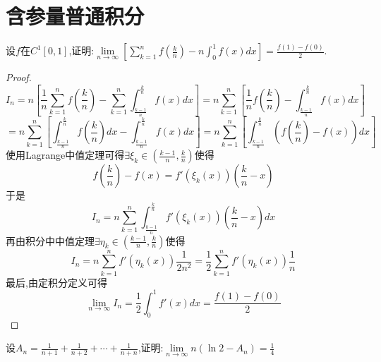 \chapter{含参量普通积分}

\begin{example}
	设$f$在$
		C^1\left[ 0,1 \right]
	$,证明:$
		\lim\limits_{n\rightarrow \infty}\left[ \sum_{k=1}^n{f\left( \frac{k}{n} \right) -n\int_0^1{f\left( x \right)}dx} \right] =\frac{f\left( 1 \right) -f\left( 0 \right)}{2}
	$.
\end{example}

\begin{proof}
	$$
		I_n=n\left[ \frac{1}{n}\sum_{k=1}^n{f\left( \frac{k}{n} \right) -\sum_{k=1}^n{\int_{\frac{k-1}{n}}^{\frac{k}{n}}{f\left( x \right)}dx}} \right] =n\sum_{k=1}^n{\left[ \frac{1}{n}f\left( \frac{k}{n} \right) -\int_{\frac{k-1}{n}}^{\frac{k}{n}}{f\left( x \right)}dx \right]}
	$$
	$$
		=n\sum_{k=1}^n{\left[ \int_{\frac{k-1}{n}}^{\frac{k}{n}}{f\left( \frac{k}{n} \right) dx}-\int_{\frac{k-1}{n}}^{\frac{k}{n}}{f\left( x \right)}dx \right]}=n\sum_{k=1}^n{\left[ \int_{\frac{k-1}{n}}^{\frac{k}{n}}{\left( f\left( \frac{k}{n} \right) -f\left( x \right) \right) dx} \right]}
	$$
	使用Lagrange中值定理可得$
		\exists \xi _k\in \left( \frac{k-1}{n},\frac{k}{n} \right)
	$使得
	$$
		f\left( \frac{k}{n} \right) -f\left( x \right) =f'\left( \xi _k\left( x \right) \right) \left( \frac{k}{n}-x \right)
	$$
	于是$$
		I_n=n\sum_{k=1}^n{\int_{\frac{k-1}{n}}^{\frac{k}{n}}{f'\left( \xi _k\left( x \right) \right) \left( \frac{k}{n}-x \right)}dx}
	$$再由积分中中值定理$
		\exists \eta _k\in \left( \frac{k-1}{n},\frac{k}{n} \right)
	$使得
	$$
		I_n=n\sum_{k=1}^n{f'\left( \eta _k\left( x \right) \right) \frac{1}{2n^2}}=\frac{1}{2}\sum_{k=1}^n{f'\left( \eta _k\left( x \right) \right) \frac{1}{n}}
	$$
	最后,由定积分定义可得
	$$
		\lim_{n\rightarrow \infty}I_n=\frac{1}{2}\int_0^1{f'\left( x \right) dx}=\frac{f\left( 1 \right) -f\left( 0 \right)}{2}
	$$
\end{proof}

\begin{example}
	设$
		A_n=\frac{1}{n+1}+\frac{1}{n+2}+\cdots +\frac{1}{n+n}
	$,证明:$
		\lim\limits_{n\rightarrow \infty}n\left( \ln 2-A_n \right) =\frac{1}{4}
	$
	\vspace{7cm}
\end{example}

